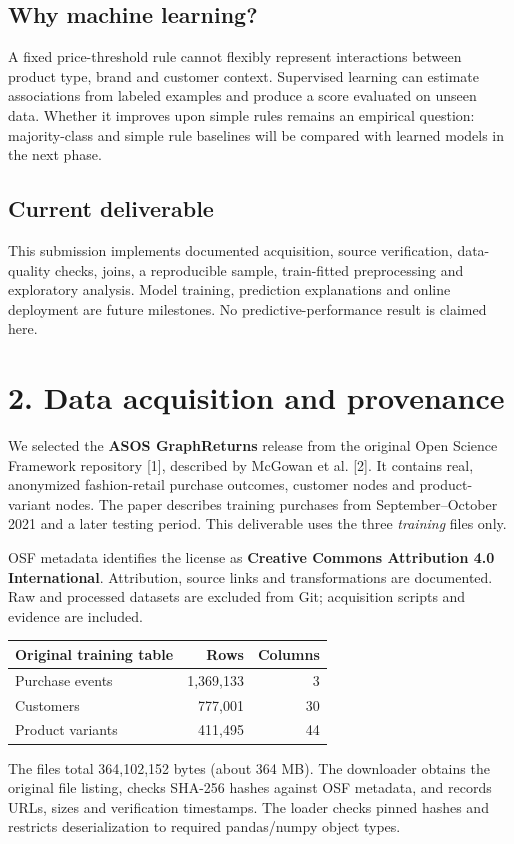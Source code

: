 \documentclass[11pt,a4paper]{article}
\newcommand{\smalltable}{\small\renewcommand{\arraystretch}{1.2}}
\begin{document}
\subsection*{Why machine learning?}
A fixed price-threshold rule cannot flexibly represent interactions between product type, brand and customer context. Supervised learning can estimate associations from labeled examples and produce a score evaluated on unseen data. Whether it improves upon simple rules remains an empirical question: majority-class and simple rule baselines will be compared with learned models in the next phase.

\subsection*{Current deliverable}
This submission implements documented acquisition, source verification, data-quality checks, joins, a reproducible sample, train-fitted preprocessing and exploratory analysis. Model training, prediction explanations and online deployment are future milestones. No predictive-performance result is claimed here.

\newpage
\section*{2. Data acquisition and provenance}
We selected the \textbf{ASOS GraphReturns} release from the original Open Science Framework repository [1], described by McGowan et al. [2]. It contains real, anonymized fashion-retail purchase outcomes, customer nodes and product-variant nodes. The paper describes training purchases from September--October 2021 and a later testing period. This deliverable uses the three \emph{training} files only.

OSF metadata identifies the license as \textbf{Creative Commons Attribution 4.0 International}. Attribution, source links and transformations are documented. Raw and processed datasets are excluded from Git; acquisition scripts and evidence are included.
\begin{center}\smalltable
\begin{tabularx}{\linewidth}{Xrr}
\toprule Original training table & Rows & Columns\\ \midrule
Purchase events & 1,369,133 & 3\\
Customers & 777,001 & 30\\
Product variants & 411,495 & 44\\ \bottomrule
\end{tabularx}\end{center}
The files total 364,102,152 bytes (about 364 MB). The downloader obtains the original file listing, checks SHA-256 hashes against OSF metadata, and records URLs, sizes and verification timestamps. The loader checks pinned hashes and restricts deserialization to required pandas/numpy object types.
\end{document}
